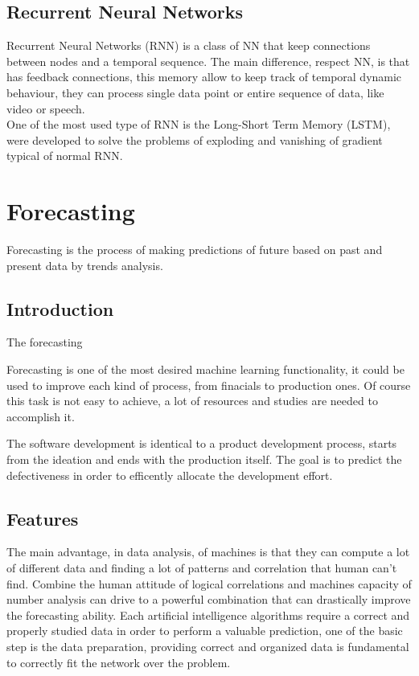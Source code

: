 \documentclass[%
    corpo=12pt,
    twoside,
    oldstyle,
    autoretitolo,
    greek,
    evenboxes,
]{toptesi}
\begin{document}
\section{Recurrent Neural Networks}
Recurrent Neural Networks (RNN) is a class of NN that keep connections between nodes and a temporal sequence. The main difference, respect NN, is that has feedback connections, this memory allow to keep track of temporal dynamic behaviour, they can process single data point or entire sequence of data, like video or speech.\\
One of the most used type of RNN is the Long-Short Term Memory (LSTM), were developed to solve the problems of exploding and vanishing of gradient typical of normal RNN.



\chapter{Forecasting}
Forecasting is the process of making predictions of future based on past and present data by trends analysis.

\section{Introduction}
The forecasting

Forecasting is one of the most desired machine learning functionality, it could be used to improve each kind of process, from finacials to production ones. Of course this task is not easy to achieve, a lot of resources and studies are needed to accomplish it.

The software development is identical to a product development process, starts from the ideation and ends with the production itself.
The goal is to predict the defectiveness in order to efficently allocate the development effort.

\section{Features}
The main advantage, in data analysis, of machines is that they can compute a lot of different data and finding a lot of patterns and correlation that human can't find. Combine the human attitude of logical correlations and machines capacity of number analysis can drive to a powerful combination that can drastically improve the forecasting ability.
Each artificial intelligence algorithms require a correct and properly studied data in order to perform a valuable prediction, one of the basic step is the data preparation, providing correct and organized data is fundamental to correctly fit the network over the problem.
\end{document}
